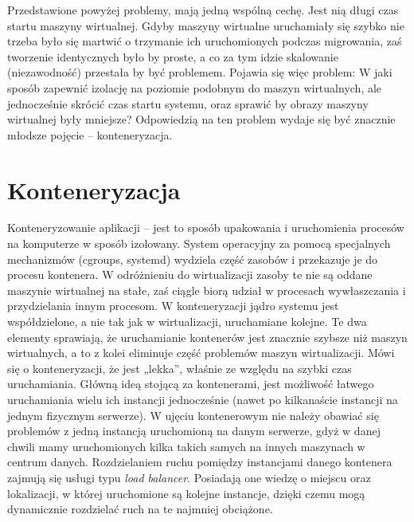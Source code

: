 \documentclass[10pt,a4paper,titlepage,twoside]{report}
\begin{document}
\indent \indent Przedstawione powyżej problemy, mają jedną wspólną cechę. Jest nią długi czas startu maszyny wirtualnej. Gdyby maszyny wirtualne uruchamiały się szybko nie trzeba było się martwić o trzymanie ich uruchomionych podczas migrowania, zaś tworzenie identycznych było by proste, a co za tym idzie skalowanie (niezawodność) przestała by być problemem. Pojawia się więc problem: W jaki sposób zapewnić izolację na poziomie podobnym do maszyn wirtualnych, ale jednocześnie skrócić czas startu systemu, oraz sprawić by obrazy maszyny wirtualnej były mniejsze? Odpowiedzią na ten problem wydaje się być znacznie młodsze pojęcie – konteneryzacja.

\section{Konteneryzacja}
\indent \indent Konteneryzowanie aplikacji – jest to sposób upakowania i uruchomienia procesów na komputerze w sposób izolowany. System operacyjny za pomocą specjalnych mechanizmów (cgroups, systemd) wydziela część zasobów i przekazuje je do procesu kontenera. W odróżnieniu do wirtualizacji zasoby te nie są oddane maszynie wirtualnej na stałe, zaś ciągle biorą udział w procesach wywłaszczania i przydzielania innym procesom. W konteneryzacji jądro systemu jest współdzielone, a nie tak jak w wirtualizacji, uruchamiane kolejne. Te dwa elementy sprawiają, że uruchamianie kontenerów jest znacznie szybsze niż maszyn wirtualnych\cite{ad21}, a to z kolei eliminuje część problemów maszyn wirtualizacji. Mówi się o konteneryzacji, że jest „lekka”, właśnie ze względu na szybki czas uruchamiania. Główną ideą stojącą za kontenerami, jest możliwość łatwego uruchamiania wielu ich instancji jednocześnie (nawet po kilkanaście instancji na jednym fizycznym serwerze). W ujęciu kontenerowym nie należy obawiać się problemów z jedną instancją uruchomioną na danym serwerze, gdyż w danej chwili mamy uruchomionych kilka takich samych na innych maszynach w centrum danych. Rozdzielaniem ruchu pomiędzy instancjami danego kontenera zajmują się usługi typu \textit{load balancer}. Posiadają one wiedzę o miejscu oraz lokalizacji, w której uruchomione są kolejne instancje, dzięki czemu mogą dynamicznie rozdzielać ruch na te najmniej obciążone.
\end{document}
